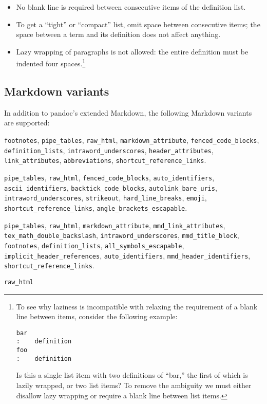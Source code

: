\documentclass[]{article}
\providecommand{\tightlist}{%
  \setlength{\itemsep}{0pt}\setlength{\parskip}{0pt}}
\begin{document}
\begin{itemize}
\tightlist
\item
  No blank line is required between consecutive items of the definition
  list.
\item
  To get a ``tight'' or ``compact'' list, omit space between consecutive
  items; the space between a term and its definition does not affect
  anything.
\item
  Lazy wrapping of paragraphs is not allowed: the entire definition must
  be indented four spaces.\footnote{To see why laziness is incompatible
    with relaxing the requirement of a blank line between items,
    consider the following example:

\begin{Verbatim}
bar
:    definition
foo
:    definition
\end{Verbatim}

    Is this a single list item with two definitions of ``bar,'' the
    first of which is lazily wrapped, or two list items? To remove the
    ambiguity we must either disallow lazy wrapping or require a blank
    line between list items.}
\end{itemize}

\subsection{Markdown variants}\label{markdown-variants}

In addition to pandoc's extended Markdown, the following Markdown
variants are supported:

\begin{description}
\tightlist
\item[\texttt{markdown\_phpextra} (PHP Markdown Extra)]
\texttt{footnotes}, \texttt{pipe\_tables}, \texttt{raw\_html},
\texttt{markdown\_attribute}, \texttt{fenced\_code\_blocks},
\texttt{definition\_lists}, \texttt{intraword\_underscores},
\texttt{header\_attributes}, \texttt{link\_attributes},
\texttt{abbreviations}, \texttt{shortcut\_reference\_links}.
\item[\texttt{markdown\_github} (GitHub-Flavored Markdown)]
\texttt{pipe\_tables}, \texttt{raw\_html},
\texttt{fenced\_code\_blocks}, \texttt{auto\_identifiers},
\texttt{ascii\_identifiers}, \texttt{backtick\_code\_blocks},
\texttt{autolink\_bare\_uris}, \texttt{intraword\_underscores},
\texttt{strikeout}, \texttt{hard\_line\_breaks}, \texttt{emoji},
\texttt{shortcut\_reference\_links},
\texttt{angle\_brackets\_escapable}.
\item[\texttt{markdown\_mmd} (MultiMarkdown)]
\texttt{pipe\_tables}, \texttt{raw\_html}, \texttt{markdown\_attribute},
\texttt{mmd\_link\_attributes}, \texttt{tex\_math\_double\_backslash},
\texttt{intraword\_underscores}, \texttt{mmd\_title\_block},
\texttt{footnotes}, \texttt{definition\_lists},
\texttt{all\_symbols\_escapable}, \texttt{implicit\_header\_references},
\texttt{auto\_identifiers}, \texttt{mmd\_header\_identifiers},
\texttt{shortcut\_reference\_links}.
\item[\texttt{markdown\_strict} (Markdown.pl)]
\texttt{raw\_html}
\end{description}
\end{document}

